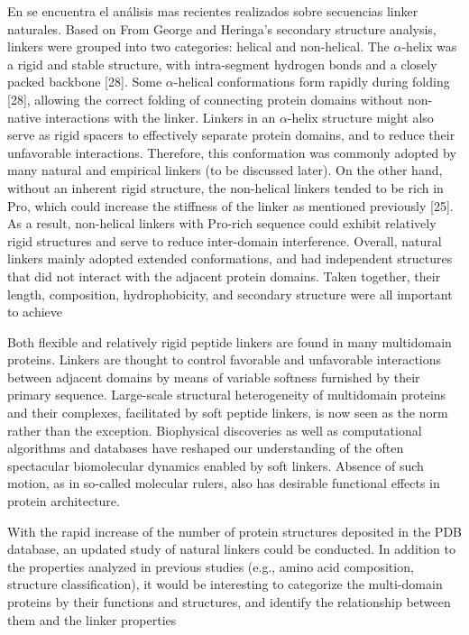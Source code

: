 En \cite{george2002analysis} se encuentra el análisis mas recientes realizados sobre secuencias linker naturales.
Based on From George and
Heringa’s secondary structure analysis, linkers were grouped into two categories: helical and
non-helical. The $\alpha$-helix was a rigid and stable structure, with intra-segment hydrogen bonds
and a closely packed backbone [28]. Some $\alpha$-helical conformations form rapidly during
folding [28], allowing the correct folding of connecting protein domains without non-native
interactions with the linker. Linkers in an $\alpha$-helix structure might also serve as rigid spacers
to effectively separate protein domains, and to reduce their unfavorable interactions.
Therefore, this conformation was commonly adopted by many natural and empirical linkers
(to be discussed later). On the other hand, without an inherent rigid structure, the non-helical
linkers tended to be rich in Pro, which could increase the stiffness of the linker as mentioned
previously [25]. As a result, non-helical linkers with Pro-rich sequence could exhibit
relatively rigid structures and serve to reduce inter-domain interference.
Overall, natural linkers mainly adopted extended conformations, and had independent
structures that did not interact with the adjacent protein domains. Taken together, their
length, composition, hydrophobicity, and secondary structure were all important to achieve



Both flexible and relatively rigid peptide linkers are found in many multidomain proteins. 
Linkers are thought to control favorable and unfavorable interactions between adjacent domains by means of variable softness
furnished by their primary sequence. Large-scale structural heterogeneity of multidomain proteins
and their complexes, facilitated by soft peptide linkers, is now seen as the norm rather than the
exception. Biophysical discoveries as well as computational algorithms and databases have
reshaped our understanding of the often spectacular biomolecular dynamics enabled by soft linkers.
Absence of such motion, as in so-called molecular rulers, also has desirable functional effects in
protein architecture.





With the rapid increase of the number of protein structures deposited in the PDB database, an updated study of natural linkers could be conducted. 
In addition to the properties analyzed in previous studies (e.g., amino acid composition, structure classification), 
it would be interesting to categorize the multi-domain proteins by their functions and structures, and identify the relationship between them and the linker properties




